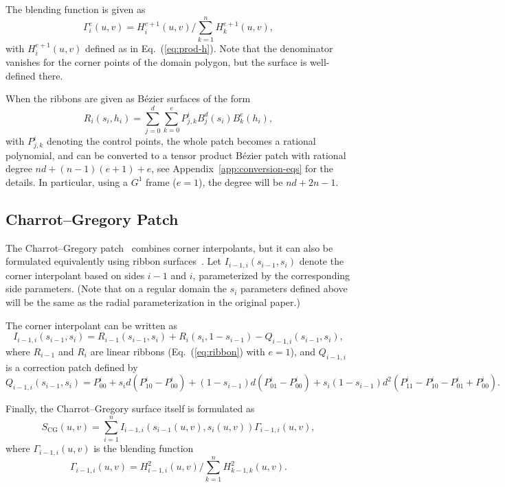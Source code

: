 \documentclass[9pt,academicons]{article}
\begin{document}
The blending function is given as
\begin{equation}
  \Gamma_i^{e}(u,v)=H_i^{e+1}(u,v)\big/\sum_{k=1}^nH_k^{e+1}(u,v),
\end{equation}
with $H_i^{e+1}(u,v)$ defined as in Eq.~(\ref{eq:prod-h}).
Note that the denominator vanishes for the corner points of the domain polygon,
but the surface is well-defined there.

When the ribbons are given as B\'ezier surfaces of the form
\begin{equation}
  \label{eq:ribbon}
  R_i(s_i,h_i)=\sum_{j=0}^d\sum_{k=0}^{e}P_{j,k}^iB_j^d(s_i)B_k^{e}(h_i),
\end{equation}
with $P_{j,k}^i$ denoting the control points,
the whole patch becomes a rational polynomial, and can be converted to
a tensor product B\'ezier patch with rational degree $nd+(n-1)(e+1)+e$,
see Appendix~\ref{app:conversion-eqs} for the details.
In particular, using a $G^1$ frame ($e=1$), the degree will be $nd+2n-1$.

\subsection{Charrot--Gregory Patch}
\label{subsec:charrot}
The Charrot--Gregory patch~\cite{Charrot:1984} combines corner interpolants, but it can
also be formulated equivalently using ribbon surfaces~\cite{Salvi:2014}.
Let $I_{i-1,i}(s_{i-1},s_i)$ denote the corner interpolant based on sides $i-1$ and $i$,
parameterized by the corresponding side parameters.
(Note that on a regular domain the $s_i$ parameters defined above
will be the same as the radial parameterization in the original paper.)

The corner interpolant can be written as
\begin{equation}
  I_{i-1,i}(s_{i-1},s_i)=R_{i-1}(s_{i-1},s_i)+R_i(s_i,1-s_{i-1})-Q_{i-1,i}(s_{i-1},s_i),
\end{equation}
where $R_{i-1}$ and $R_i$ are linear ribbons (Eq.~(\ref{eq:ribbon}) with $e=1$),
and $Q_{i-1,i}$ is a correction patch defined by
\begin{equation}
  Q_{i-1,i}(s_{i-1},s_i)=P_{00}^i+s_id(P_{10}^i-P_{00}^i)+(1-s_{i-1})d(P_{01}^i-P_{00}^i)
  +s_i(1-s_{i-1})d^2(P_{11}^i-P_{10}^i-P_{01}^i+P_{00}^i).
\end{equation}

Finally, the Charrot--Gregory surface itself is formulated as
\begin{equation}
  S_\mathrm{CG}(u,v)=\sum_{i=1}^n I_{i-1,i}(s_{i-1}(u,v),s_i(u,v))\Gamma_{i-1,i}(u,v),
\end{equation}
where $\Gamma_{i-1,i}(u,v)$ is the blending function
\begin{equation}
  \Gamma_{i-1,i}(u,v)=H_{i-1,i}^2(u,v)\big/\sum_{k=1}^nH_{k-1,k}^2(u,v).
\end{equation}
\end{document}
